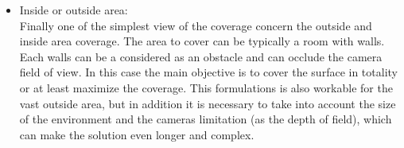 \begin{itemize}
\item Inside or outside area:\\ 
Finally one of the simplest view of the coverage concern the outside and inside area coverage. The area to cover can be typically a room with walls. Each walls can be a considered as an obstacle and can occlude the camera field of view. In this case the main objective is to cover the surface in totality or at least maximize the coverage. This formulations is also workable for the vast outside area, but in addition it is necessary to take into account the size of the environment and the cameras limitation (as the depth of field), which can make the solution even longer and complex.
   
\end{itemize}
  






